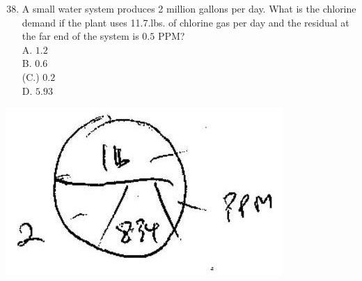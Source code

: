 \documentclass[10pt]{article}
\begin{document}
\begin{enumerate}
  \setcounter{enumi}{37}
  \item A small water system produces 2 million gallons per day. What is the chlorine demand if the plant uses 11.7.lbs. of chlorine gas per day and the residual at the far end of the system is $0.5$ PPM?\\
A. $1.2$\\
B. $0.6$\\
(C.) $0.2$\\
D. $5.93$
\end{enumerate}

\includegraphics[max width=\textwidth]{2022_11_11_a5e8a54031fc138b833ag-5(4)}
\end{document}
